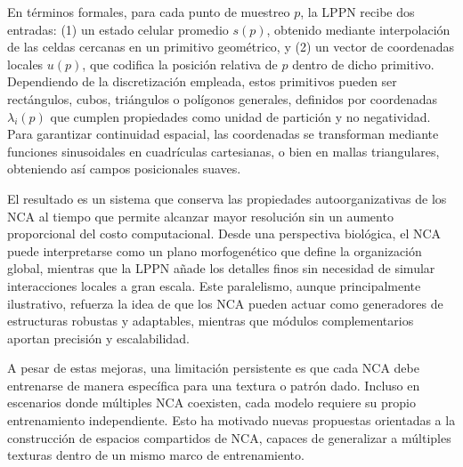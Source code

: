 En términos formales, para cada punto de muestreo $p$, la LPPN recibe dos entradas: (1) un estado celular promedio $s(p)$, obtenido mediante interpolación de las celdas cercanas en un primitivo geométrico, y (2) un vector de coordenadas locales $u(p)$, que codifica la posición relativa de $p$ dentro de dicho primitivo. Dependiendo de la discretización empleada, estos primitivos pueden ser rectángulos, cubos, triángulos o polígonos generales, definidos por coordenadas $\lambda_i(p)$ que cumplen propiedades como unidad de partición y no negatividad. Para garantizar continuidad espacial, las coordenadas se transforman mediante funciones sinusoidales en cuadrículas cartesianas, o bien en mallas triangulares, obteniendo así campos posicionales suaves.

El resultado es un sistema que conserva las propiedades autoorganizativas de los NCA al tiempo que permite alcanzar mayor resolución sin un aumento proporcional del costo computacional. Desde una perspectiva biológica, el NCA puede interpretarse como un plano morfogenético que define la organización global, mientras que la LPPN añade los detalles finos sin necesidad de simular interacciones locales a gran escala. Este paralelismo, aunque principalmente ilustrativo, refuerza la idea de que los NCA pueden actuar como generadores de estructuras robustas y adaptables, mientras que módulos complementarios aportan precisión y escalabilidad.

A pesar de estas mejoras, una limitación persistente es que cada NCA debe entrenarse de manera específica para una textura o patrón dado. Incluso en escenarios donde múltiples NCA coexisten, cada modelo requiere su propio entrenamiento independiente. Esto ha motivado nuevas propuestas orientadas a la construcción de espacios compartidos de NCA, capaces de generalizar a múltiples texturas dentro de un mismo marco de entrenamiento.
